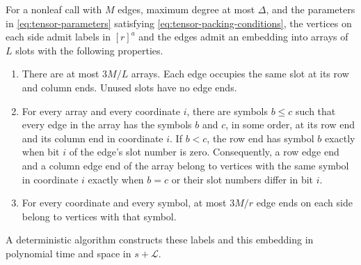 \begin{lemma}\label{lem:tensor-arrays}
For a nonleaf call with $M$ edges, maximum degree at most $\Delta$,
and the parameters in \eqref{eq:tensor-parameters} satisfying
\eqref{eq:tensor-packing-conditions}, the vertices on each side admit
labels in $[r]^a$ and the edges admit an embedding into arrays of
$L$ slots with the following properties.
\begin{enumerate}
\item There are at most $3M/L$ arrays.  Each edge occupies the same
      slot at its row and column ends. Unused slots have no edge ends.
\item For every array and every coordinate $i$, there are symbols
      $b\le c$ such that every edge in the array has the symbols $b$
      and $c$, in some order, at its row end and its column end in
      coordinate $i$. If $b<c$, the row end has symbol $b$ exactly
      when bit $i$ of the edge's slot number is zero. Consequently, a
      row edge end and a column edge end of the array belong to
      vertices with the same symbol in coordinate $i$ exactly when
      $b=c$ or their slot numbers differ in bit $i$.
\item For every coordinate and every symbol, at most $3M/r$ edge ends on each side belong to vertices with that symbol.
\end{enumerate}
A deterministic algorithm constructs these labels and this embedding in polynomial time and space in $s+\mathcal L$.
\end{lemma}
